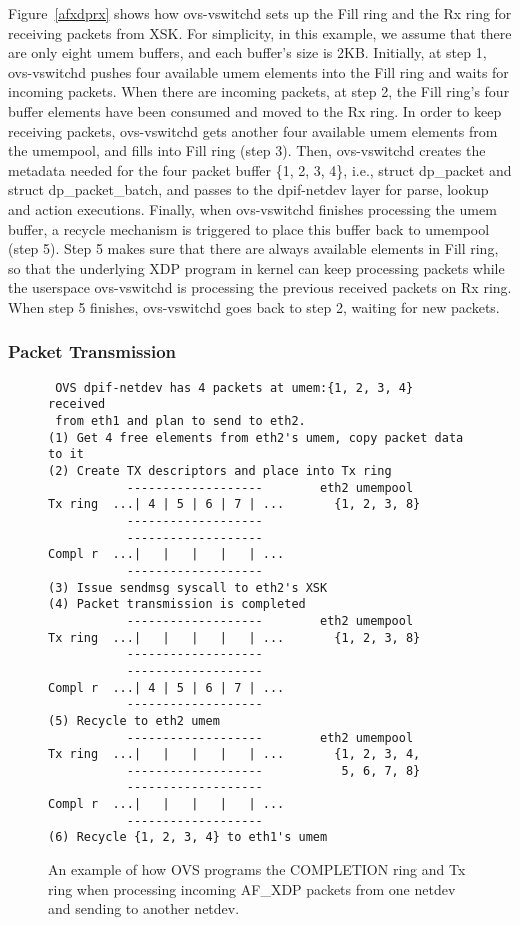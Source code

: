 \documentclass[10pt]{sigplanconf}
\begin{document}
Figure~\ref{afxdprx} shows how ovs-vswitchd sets up the Fill ring and
the Rx ring for receiving packets from XSK.  For simplicity, in this example,
we assume that there are only eight umem buffers, and each buffer's
size is 2KB.  Initially, at step 1, ovs-vswitchd pushes four available umem
elements into
the Fill ring and waits for incoming packets.  When there are incoming packets,
at step 2, the Fill ring's four buffer elements have been consumed and moved
to the Rx ring.  In order to keep receiving packets, ovs-vswitchd gets another
four available umem elements from the umempool, and fills into Fill ring (step 3).
Then, ovs-vswitchd creates the metadata needed for the four packet
buffer \{1, 2, 3, 4\}, i.e., struct dp\_packet and struct dp\_packet\_batch, and passes to 
the dpif-netdev layer for parse, lookup and action executions.
Finally, when ovs-vswitchd finishes processing the umem buffer, a recycle
mechanism is triggered to place this buffer back to umempool (step 5).
Step 5 makes sure that there are always available elements in Fill ring, so
that the underlying XDP program in kernel can keep processing packets 
while the userspace ovs-vswitchd is processing the previous
received packets on Rx ring.
When step 5 finishes, ovs-vswitchd goes back to step 2, waiting for
new packets.

\subsubsection{Packet Transmission}
\begin{figure}
{\scriptsize
\begin{verbatim}
 OVS dpif-netdev has 4 packets at umem:{1, 2, 3, 4} received
 from eth1 and plan to send to eth2.
(1) Get 4 free elements from eth2's umem, copy packet data to it
(2) Create TX descriptors and place into Tx ring
           -------------------        eth2 umempool
Tx ring  ...| 4 | 5 | 6 | 7 | ...       {1, 2, 3, 8}
           -------------------
           -------------------
Compl r  ...|   |   |   |   | ...
           -------------------
(3) Issue sendmsg syscall to eth2's XSK
(4) Packet transmission is completed
           -------------------        eth2 umempool
Tx ring  ...|   |   |   |   | ...       {1, 2, 3, 8}
           -------------------
           -------------------
Compl r  ...| 4 | 5 | 6 | 7 | ...
           -------------------
(5) Recycle to eth2 umem
           -------------------        eth2 umempool
Tx ring  ...|   |   |   |   | ...       {1, 2, 3, 4,
           -------------------           5, 6, 7, 8}
           -------------------
Compl r  ...|   |   |   |   | ...
           -------------------
(6) Recycle {1, 2, 3, 4} to eth1's umem 
\end{verbatim}
}
\vspace{-1.0em}
\caption{An example of how OVS programs the COMPLETION ring and Tx ring when
processing incoming AF\_XDP packets from one netdev and sending to another netdev.}
\label{afxdptx}
\vspace{-1.0em}
\end{figure}
\end{document}
